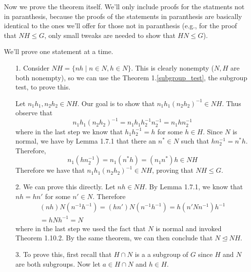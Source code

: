 \documentclass[12pt,letterpaper]{algebra_book}
\newcommand{\normal}{\unlhd}
\theoremstyle{definition}
\begin{document}
    Now we prove the theorem itself. We'll only include proofs for the
    statments not in paranthesis, because the proofs of the statements in paranthesis
    are basically identical to the ones we'll offer for those not in
    paranthesis (e.g., for the proof that $NH \le G$, only small
    tweaks are needed to show that $HN \le G$).
    \begin{prf}
        We'll prove one statement at a time. 

        \begin{itemize}
            \item[1.] \textcolor{NavyBlue}{Consider $NH = \{nh \mid n \in N, h
            \in N\}$. This is clearly nonempty ($N, H$ are both
            nonempty), so we can use the Theorem
            1.\ref{subgroup_test}, the subgroup test, to prove this.}

            Let $n_1h_1, n_2h_2 \in NH$. Our goal is to show that
            $n_1h_1(n_2h_2)^{-1} \in NH$. Thus observe that 
            \[
                n_1h_1(n_2h_2)^{-1} = n_1h_1h_2^{-1}n_2^{-1} = n_1hn_2^{-1}
            \]
            where in the last step we know that $h_1h_2^{-1} = h$ for
            some $h \in H$. 
            Since $N$ is normal, we have by Lemma 1.7.1 that there
            an $n^* \in N$ such that $hn_2^{-1} = n^*h$. Therefore,
            \[
                n_1(hn_2^{-1}) = n_1(n^*h) = (n_1n^*)h \in NH
            \]
            Therefore we have that
            $n_1h_1(n_2h_2)^{-1} \in NH$, proving that $NH \le G$.
            
            \item[2.] \textcolor{NavyBlue}{We can prove this directly.} Let $nh \in
            NH$. By Lemma 1.7.1, we know that $nh = hn'$ for some $n'
            \in N$. Therefore 
            \begin{align*}
                (nh)N(n^{-1}h^{-1}) = (hn')N(n^{-1}h^{-1})
                = h(n'Nn^{-1})h^{-1}\\ = hNh^{-1} = N
            \end{align*}
            where in the last step we used the fact that $N$ is normal
            and invoked Theorem 1.10.2. By the same theorem, we can
            then conclude that $N \normal NH$.

            \item[3.] \textcolor{NavyBlue}{To prove this, first recall that $H \cap N$ is a
            a subgroup of $G$ since $H$ and $N$ are both subgroups.}
            Now let $a \in H \cap N$ and $h \in H$. 
            

\end{itemize}
\end{prf}
\end{document}
